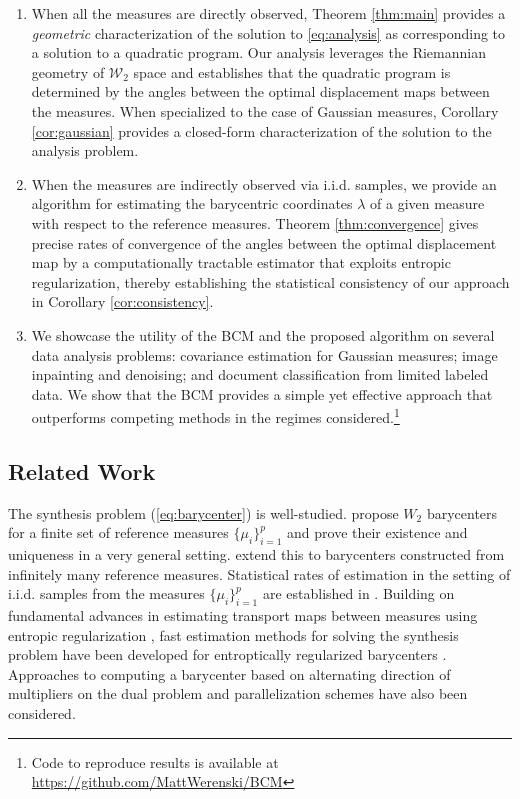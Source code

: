 \documentclass[nohyperref]{article}
\theoremstyle{definition}
\begin{document}
\begin{enumerate}[(1)]
\setlength \itemsep{-3pt}
    \item When all the measures are directly observed, Theorem \ref{thm:main} provides a \emph{geometric} characterization of the solution to \eqref{eq:analysis} as corresponding to a solution to a quadratic program.  Our analysis leverages the Riemannian geometry of $\mathcal{W}_{2}$ space and establishes that the quadratic program is determined by the angles between the optimal displacement maps between the measures.  When specialized to the case of Gaussian measures, Corollary \ref{cor:gaussian} provides a closed-form characterization of the solution to the analysis problem.
    
    \item When the measures are indirectly observed via i.i.d. samples, we provide an algorithm for estimating the barycentric coordinates $\lambda$ of a given measure with respect to the reference measures.  Theorem \ref{thm:convergence} gives precise rates of convergence of the angles between the optimal displacement map by a computationally tractable estimator that exploits entropic regularization, thereby establishing the statistical consistency of our approach in Corollary \ref{cor:consistency}.
    
    \item We showcase the utility of the BCM and the proposed algorithm on several data analysis problems: covariance estimation for Gaussian measures; image inpainting and denoising; and document classification from limited labeled data. We show that the BCM provides a simple yet effective approach that outperforms competing methods in the regimes considered.\footnote{Code to reproduce results is available at \url{https://github.com/MattWerenski/BCM}} 
\end{enumerate}

\subsection{Related Work}

The synthesis problem (\ref{eq:barycenter}) is well-studied.  \citep{agueh2011barycenters} propose $W_{2}$ barycenters for a finite set of reference measures $\{\mu_{i}\}_{i=1}^{p}$ and prove their existence and uniqueness in a very general setting.  \citep{le2017existence} extend this to barycenters constructed from infinitely many reference measures. Statistical rates of estimation in the setting of i.i.d. samples from the measures $\{\mu_{i}\}_{i=1}^{p}$ are established in \cite{kroshnin2019complexity}.  Building on fundamental advances in estimating transport maps between measures using entropic regularization \cite{cuturi2013sinkhorn}, fast estimation methods for solving the synthesis problem have been developed for entroptically regularized barycenters \cite{cuturi2014fast}.  Approaches to computing a barycenter based on alternating direction of multipliers on the dual problem \cite{yang2021fast} and parallelization schemes \cite{claici2018stochastic} have also been considered.
\end{document}
